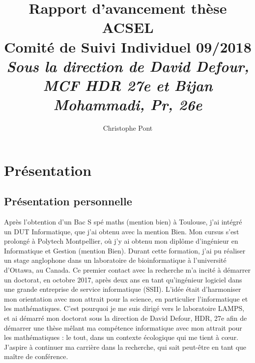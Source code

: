 \documentclass[a4paper,11pt]{article}
\title{%
  Rapport d'avancement thèse ACSEL \\
  \large Comité de Suivi Individuel 09/2018 \\ %
  \large \textit{Sous la direction de David Defour, MCF HDR 27e et Bijan Mohammadi, Pr, 26e}}
\author{Christophe Pont}
\begin{document}
\maketitle
\tableofcontents


\section{Présentation}

\subsection{Présentation personnelle}
Après l’obtention d’un Bac S spé maths (mention bien) à Toulouse, j’ai intégré un DUT Informatique, que j'ai obtenu avec la mention Bien. Mon cursus s’est prolongé à Polytech Montpellier, où j’y ai obtenu mon diplôme d’ingénieur en Informatique et Gestion (mention Bien). Durant cette formation, j’ai pu réaliser un stage anglophone dans un laboratoire de bioinformatique à l’université d’Ottawa, au Canada. Ce premier contact avec la recherche m’a incité à démarrer un doctorat, en octobre 2017, après deux ans en tant qu’ingénieur logiciel dans une grande entreprise de service informatique (SSII). L’idée était d’harmoniser mon orientation avec mon attrait pour la science, en particulier l’informatique et les mathématiques. C’est pourquoi je me suis dirigé vers le laboratoire LAMPS, et ai démarré mon doctorat sous la direction de David Defour, HDR, 27e afin de démarrer une thèse mêlant ma compétence informatique avec mon attrait pour les mathématiques : le tout, dans un contexte écologique qui me tient à cœur. J’aspire à continuer ma carrière dans la recherche, qui sait peut-être en tant que maître de conférence.

\end{document}
